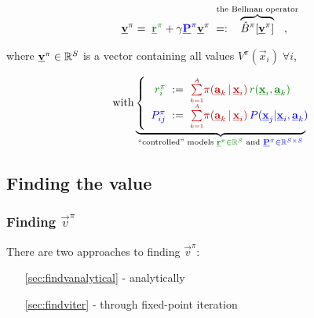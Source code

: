 \begin{frame}
	
	\begin{equation}
		\vec v^\pi
		= \; {\color{reward}\vec r^\pi} 
			+ \gamma {\color{trans}\vec P^\pi} \vec v^\pi \; =: \kern-3ex\overbrace{\hat B^\pi[\vec v^\pi]}^{\text{the Bellman operator}}\kern-3ex,
	\end{equation}
	
	where $\underline{\mathbf{v}}^\pi \in \mathbb{R}^S$ is a vector containing all values $V^\pi(\vec x_{i})\;\forall i$,
	
	\begin{align}
		\quad \text{with}  \underbrace{ \left\{ \begin{array}{rcl} 
				{\color{reward}r^\pi_i} &\kern-1ex:=\kern-1ex& 
					{\color{policy} \smallsum{k=1}{A} 
					\pi(\vec a_k \,|\, \vec x_i)} \, 
					{\color{reward} r(\vec x_i, \vec a_k)} \\
				{\color{trans}P^\pi_{ij}} &\kern-1ex:=\kern-1ex& 
					{\color{policy}\smallsum{k=1}{A} 
					\pi(\vec a_k \,|\, \vec x_i)} \, 
					{\color{trans}P(\vec x_j | \vec x_i, \vec a_k)} \\
			\end{array} 
			\right.\kern-2ex}_{
				\text{``controlled'' models }
				{\color{reward}\vec r^\pi \in \R^S}
				\text{ and }{\color{trans}\vec P^\pi \in \R^{S \times S}}
			}
	\end{align}
	
\end{frame}

\subsection{Finding the value}

\begin{frame}\frametitle{Finding $\vec v^\pi$}

There are two approaches to finding $\vec v^\pi$:

\begin{enumerate}
\item[\ref{sec:findvanalytical} -] analytically
\item[\ref{sec:findviter} -] through fixed-point iteration
\end{enumerate}

\end{frame}

